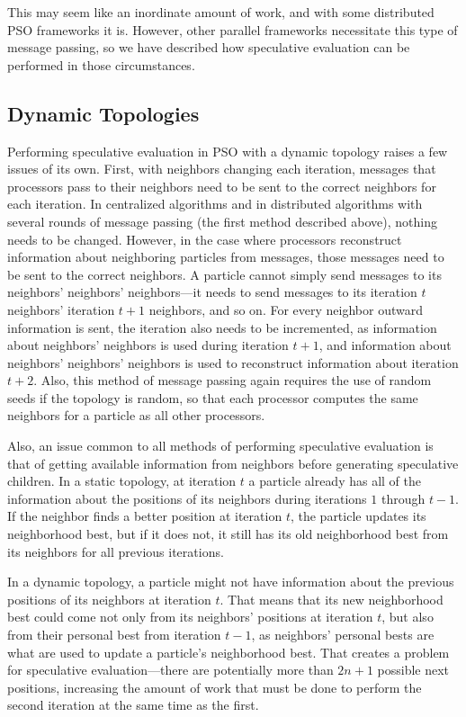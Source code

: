 \documentclass[journal,letterpaper]{IEEEtran}
\begin{document}
This may seem like an inordinate amount of work, and with some distributed PSO
frameworks it is.  However, other parallel frameworks necessitate this type of
message passing, so we have described how speculative evaluation can be
performed in those circumstances.

\subsection{Dynamic Topologies}

Performing speculative evaluation in PSO with a dynamic topology raises a few
issues of its own.  First, with neighbors changing each iteration, messages
that processors pass to their neighbors need to be sent to the correct
neighbors for each iteration.  In centralized algorithms and in distributed
algorithms with several rounds of message passing (the first method described
above), nothing needs to be changed.  However, in the case where processors
reconstruct information about neighboring particles from messages, those
messages need to be sent to the correct neighbors.  A particle cannot simply
send messages to its neighbors' neighbors' neighbors---it needs to send
messages to its iteration $t$ neighbors' iteration $t+1$ neighbors, and so on.
For every neighbor outward information is sent, the iteration also needs to be
incremented, as information about neighbors' neighbors is used during iteration
$t+1$, and information about neighbors' neighbors' neighbors is used to
reconstruct information about iteration $t+2$.  Also, this method of message
passing again requires the use of random seeds if the topology is random, so
that each processor computes the same neighbors for a particle as all other
processors.

Also, an issue common to all methods of performing speculative evaluation is
that of getting available information from neighbors before generating
speculative children.  In a static topology, at iteration $t$ a particle
already has all of the information about the positions of its neighbors during
iterations $1$ through $t-1$.  If the neighbor finds a better position at 
iteration $t$, the particle updates its neighborhood best, but if it does not,
it still has its old neighborhood best from its neighbors for all previous 
iterations.

In a dynamic topology, a particle might not have information about the previous
positions of its neighbors at iteration $t$.  That means that its new
neighborhood best could come not only from its neighbors' positions at
iteration $t$, but also from their personal best from iteration $t-1$, as
neighbors' personal bests are what are used to update a particle's neighborhood
best.  That creates a problem for speculative evaluation---there are
potentially more than $2n+1$ possible next positions, increasing the amount of
work that must be done to perform the second iteration at the same time as the
first.
\end{document}
